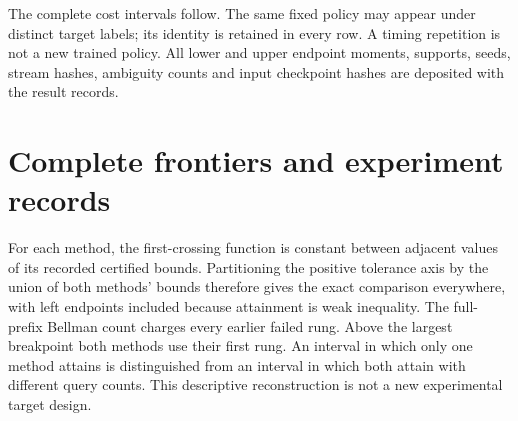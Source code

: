 The complete cost intervals follow. The same fixed policy may appear under distinct target labels; its identity is retained in every row. A timing repetition is not a new trained policy. All lower and upper endpoint moments, supports, seeds, stream hashes, ambiguity counts and input checkpoint hashes are deposited with the result records.


\section{Complete frontiers and experiment records}\label{supp:frontiers47}
For each method, the first-crossing function is constant between adjacent values of its recorded certified bounds. Partitioning the positive tolerance axis by the union of both methods' bounds therefore gives the exact comparison everywhere, with left endpoints included because attainment is weak inequality. The full-prefix Bellman count charges every earlier failed rung. Above the largest breakpoint both methods use their first rung. An interval in which only one method attains is distinguished from an interval in which both attain with different query counts. This descriptive reconstruction is not a new experimental target design.


